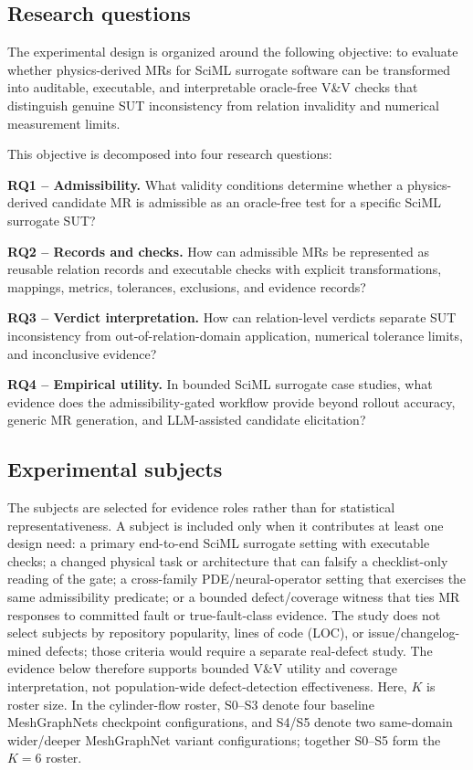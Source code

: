 \documentclass[preprint,12pt,authoryear]{elsarticle}
\begin{document}
\subsection{Research questions}
\label{subsec:rqs}
\label{subsec:evaluation-logic}

The experimental design is organized around the following objective: to evaluate whether physics-derived MRs for SciML surrogate software can be transformed into auditable, executable, and interpretable oracle-free V\&V checks that distinguish genuine SUT inconsistency from relation invalidity and numerical measurement limits.

This objective is decomposed into four research questions:

\textbf{RQ1 -- Admissibility.} What validity conditions determine whether a physics-derived candidate MR is admissible as an oracle-free test for a specific SciML surrogate SUT?

\textbf{RQ2 -- Records and checks.} How can admissible MRs be represented as reusable relation records and executable checks with explicit transformations, mappings, metrics, tolerances, exclusions, and evidence records?

\textbf{RQ3 -- Verdict interpretation.} How can relation-level verdicts separate SUT inconsistency from out-of-relation-domain application, numerical tolerance limits, and inconclusive evidence?

\textbf{RQ4 -- Empirical utility.} In bounded SciML surrogate case studies, what evidence does the admissibility-gated workflow provide beyond rollout accuracy, generic MR generation, and LLM-assisted candidate elicitation?

\subsection{Experimental subjects}
\label{subsec:suts}

The subjects are selected for evidence roles rather than for statistical representativeness. A subject is included only when it contributes at least one design need: a primary end-to-end SciML surrogate setting with executable checks; a changed physical task or architecture that can falsify a checklist-only reading of the gate; a cross-family PDE/neural-operator setting that exercises the same admissibility predicate; or a bounded defect/coverage witness that ties MR responses to committed fault or true-fault-class evidence. The study does not select subjects by repository popularity, lines of code (LOC), or issue/changelog-mined defects; those criteria would require a separate real-defect study. The evidence below therefore supports bounded V\&V utility and coverage interpretation, not population-wide defect-detection effectiveness. Here, \(K\) is roster size. In the cylinder-flow roster, S0--S3 denote four baseline MeshGraphNets checkpoint configurations, and S4/S5 denote two same-domain wider/deeper MeshGraphNet variant configurations; together S0--S5 form the \(K=6\) roster.
\end{document}
